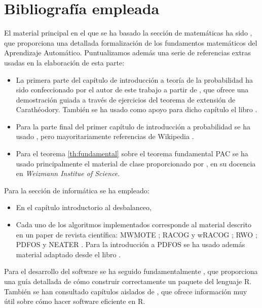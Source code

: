 \section{Bibliografía empleada}
El material principal en el que se ha basado la sección de matemáticas ha sido \citep{shalev}, 
que proporciona una detallada formalización de los fundamentos matemáticos del Aprendizaje Automático. Puntualizamos además
una serie de referencias extras usadas en la elaboración de esta parte:

\begin{itemize} 
 \item La primera parte del capítulo de introducción a teoría de la probabilidad ha sido confeccionado por el autor de 
 este trabajo a partir de \citep{caratheodory}, que ofrece una demostración guiada a través de ejercicios del teorema de extensión
 de Carathéodory. También se ha usado como apoyo para dicho capítulo el libro \citep{loeve}. 
 \item Para la parte final del primer capítulo de introducción a probabilidad se ha usado \citep{shalev}, pero
 mayoritariamente referencias de Wikipedia \citep{wiki:markov, wiki:hoeff_lemma, wiki:hoeffding}.
 \item Para el teorema \ref{th:fundamental} sobre el teorema fundamental PAC se ha usado principalmente el material de clase
 proporcionado por \citep{slfetaya}, en su docencia en \textit{Weizmann Institue of Science}.
\end{itemize}
 
 Para la sección de informática se ha empleado:
 
\begin{itemize}
 \item En el capítulo introductorio al desbalanceo, \citep{he2009} 
 \item Cada uno de los algoritmos implementados corresponde al material descrito en un paper de revista científica: 
 MWMOTE \citep{barua14}; RACOG y wRACOG \citep{das2015}; RWO \citep{zhang2014}; PDFOS \citep{gao2014} y 
 NEATER \citep{almogahed2014}. Para la introducción a PDFOS se ha usado además material adaptado desde el libro \citep{silverman}.
\end{itemize}

 Para el desarrollo del software se ha seguido fundamentalmente \citep{rhadleypkg}, que proporciona una guía detallada de
 cómo construir correctamente un paquete del lenguaje R. También se han consultado capítulos aislados de \citep{rgillespie},
 que ofrece información muy útil sobre cómo hacer software eficiente en R.
 
